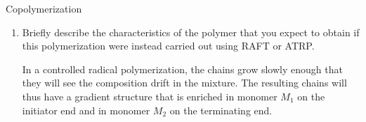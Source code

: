 \begin{activity}{Copolymerization}
\begin{exercises}
\begin{enumerate}
			\item Briefly describe the characteristics of the polymer that you expect to obtain if this polymerization were instead carried out using RAFT or ATRP.
			
				\begin{solution}{}
					In a controlled radical polymerization, the chains grow slowly enough that they will see the composition drift in the mixture.  The resulting chains will thus have a gradient structure that is enriched in monomer $M_1$ on the initiator end and in monomer $M_2$ on the terminating end.
				\end{solution}
				
		\end{enumerate}
	
	
\end{exercises}


%
%	


	
\end{activity}